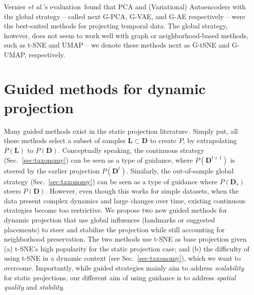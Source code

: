 Vernier \emph{et al.}'s evaluation\,\citep{Vernier2020} found that PCA and (Variational) Autoencoders with the global strategy -- called next G-PCA, G-VAE, and G-AE respectively -- were the best-suited methods for projecting temporal data. The global strategy, however, does not seem to work well with graph or neighborhood-based methods, such as t-SNE and UMAP -- we denote these methods next as G-tSNE and G-UMAP, respectively. 

\section{Guided methods for dynamic projection}
\label{sec:methods}
%
Many guided methods exist in the static projection literature\,\citep{Nonato2019,sorzano14_survey}. Simply put, all these methods select a subset of samples $\mathbf{L} \subset \mathbf{D}$ to create $P$, by extrapolating $P(\mathbf{L})$ to $P(\mathbf{D})$. Conceptually speaking, the continuous strategy (Sec.~\ref{sec:taxonomy}) can be seen as a type of guidance, where $P(\mathbf{D}^{t+1})$ is steered by the earlier projection $P(\mathbf{D}^{t})$. Similarly, the out-of-sample global strategy (Sec.~\ref{sec:taxonomy}) can be seen as a type of guidance where $P(\mathbf{D}_s)$ steers $P(\mathbf{D})$. However, even though this works for simple datasets, when the data present complex dynamics and large changes over time, existing continuous strategies become too restrictive. We propose two new guided methods for dynamic projection that use global influences (landmarks or suggested placements) to steer and stabilize the projection while still accounting for neighborhood preservation. The two methods use t-SNE as base projection given (a) t-SNE's high popularity for the static projection case; and (b) the difficulty of using t-SNE in a dynamic context (see Sec.~\ref{sec:taxonomy}), which we want to overcome.
Importantly, while guided strategies mainly aim to address \emph{scalability} for static projections, our different aim of using guidance is to address \emph{spatial quality} and \emph{stability}. 

